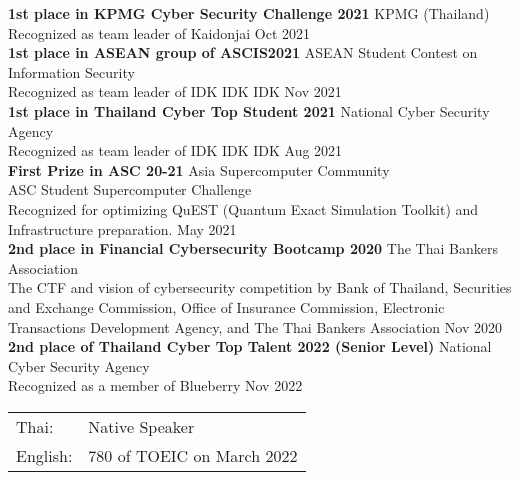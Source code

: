 \textbf{1st place in KPMG Cyber Security Challenge 2021} \hfill KPMG (Thailand)\\
Recognized as team leader of Kaidonjai \hfill Oct 2021\\
\vspace*{2mm}
\textbf{1st place in ASEAN group of ASCIS2021} \hfill ASEAN Student Contest on Information Security\\
Recognized as team leader of IDK IDK IDK \hfill Nov 2021\\
\vspace*{2mm}
\textbf{1st place in Thailand Cyber Top Student 2021} \hfill National Cyber Security Agency\\
Recognized as team leader of IDK IDK IDK \hfill Aug 2021\\
\vspace*{2mm}
\textbf{First Prize in ASC 20-21} \hfill Asia Supercomputer Community\\
ASC Student Supercomputer Challenge\\
Recognized for optimizing QuEST (Quantum Exact Simulation Toolkit) and Infrastructure preparation. \hfill May 2021\\
\vspace*{2mm}
\textbf{2nd place in Financial Cybersecurity Bootcamp 2020} \hfill The Thai Bankers\textquotesingle{} Association\\
The CTF and vision of cybersecurity competition by Bank of Thailand, Securities and Exchange Commission, Office of Insurance Commission, Electronic Transactions Development Agency, and The Thai Bankers\textquotesingle{} Association \hfill Nov 2020\\
\vspace*{2mm}
\textbf{2nd place of Thailand Cyber Top Talent 2022 (Senior Level)} \hfill National Cyber Security Agency\\
Recognized as a member of Blueberry \hfill Nov 2022\\
\vspace*{2mm}


\begin{tabular}{ l l }
	Thai: & Native Speaker\\
	English:            & 780 of TOEIC on March 2022\\
\end{tabular}
\vspace{2mm}
